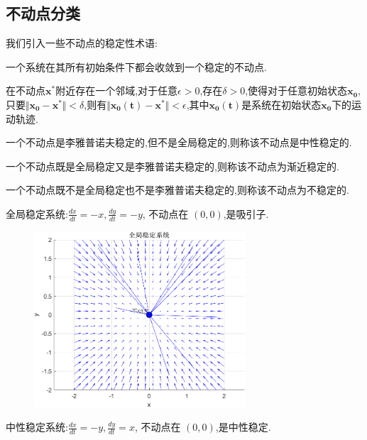 \subsection*{不动点分类}
我们引入一些不动点的稳定性术语:
\begin{defn}\cite{strogatz2018nonlinear}

    一个系统在其所有初始条件下都会收敛到一个稳定的不动点. 
\end{defn}
\begin{defn}\cite{strogatz2018nonlinear}

    在不动点$\mathbf{x^*}$附近存在一个邻域,对于任意$\epsilon>0$,存在$\delta>0$,使得对于任意初始状态$\mathbf{x_0}$,只要$\Vert \mathbf{x_0}-\mathbf{x^*}\Vert<\delta$,则有$\Vert \mathbf{x_0(t)}-\mathbf{x^*}\Vert<\epsilon$,其中$\mathbf{x_0(t)}$是系统在初始状态$\mathbf{x_0}$下的运动轨迹. 
\end{defn}
\begin{defn}\cite{strogatz2018nonlinear}

    一个不动点是李雅普诺夫稳定的,但不是全局稳定的,则称该不动点是中性稳定的. 
\end{defn}
\begin{defn}\cite{strogatz2018nonlinear}

    一个不动点既是全局稳定又是李雅普诺夫稳定的,则称该不动点为渐近稳定的. 
\end{defn}
\begin{defn}\cite{strogatz2018nonlinear}

    一个不动点既不是全局稳定也不是李雅普诺夫稳定的,则称该不动点为不稳定的. 
\end{defn}

全局稳定系统:$\frac{dx}{dt}=-x,\frac{dy}{dt}=-y$, 不动点在 $(0, 0)$,是吸引子. 
\begin{figure}[H]
    \centering
    \includegraphics[width=0.7\textwidth]{Img/fix5.png}
    \label{fig:global_stable}
\end{figure}
中性稳定系统:$\frac{dx}{dt}=-y,\frac{dy}{dt}=x$, 不动点在 $(0, 0)$,是中性稳定. 

